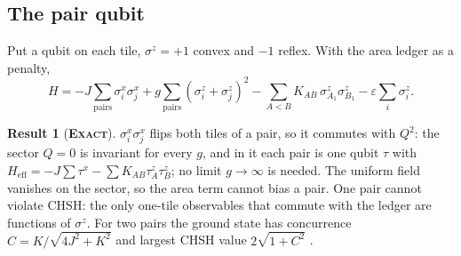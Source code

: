 \documentclass[11pt]{article}
\newcommand{\exact}{\textbf{\textsc{Exact}}}
\theoremstyle{definition}
\newtheorem{result}{Result}
\begin{document}
\subsection{The pair qubit}\label{sec:ham-pair}
Put a qubit on each tile, $\sigma^z=+1$ convex and $-1$ reflex. With the area ledger as a penalty,
\begin{equation}\label{eq:hbit}
H=-J\sum_{\mathrm{pairs}}\sigma^x_i\sigma^x_j+g\sum_{\mathrm{pairs}}(\sigma^z_i+\sigma^z_j)^2-\sum_{A<B}K_{AB}\,\sigma^z_{A_1}\sigma^z_{B_1}-\varepsilon\sum_i\sigma^z_i .
\end{equation}
\begin{result}[\exact]\label{res:ham-pair}
$\sigma^x_i\sigma^x_j$ flips both tiles of a pair, so it commutes with $Q^2$: the sector $Q=0$ is invariant for every $g$, and in it each pair is one qubit $\tau$ with $H_{\mathrm{eff}}=-J\sum\tau^x-\sum K_{AB}\tau^z_A\tau^z_B$; no limit $g\to\infty$ is needed. The uniform field vanishes on the sector, so the area term cannot bias a pair. One pair cannot violate CHSH: the only one-tile observables that commute with the ledger are functions of $\sigma^z$. For two pairs the ground state has concurrence $C=K/\sqrt{4J^2+K^2}$ \cite{wootters1998} and largest CHSH value $2\sqrt{1+C^2}$ \cite{horodecki1995}.
\end{result}
\end{document}
